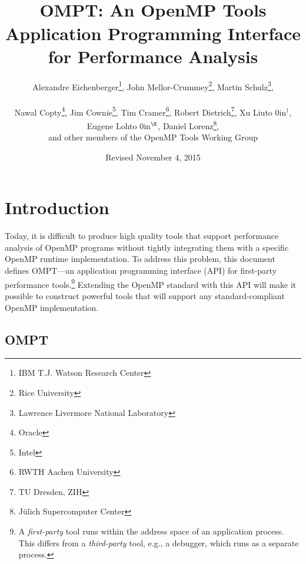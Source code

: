 \documentclass{article}
\title{OMPT: An OpenMP\textsuperscript{\textregistered} Tools Application Programming Interface for Performance Analysis}
\author{Alexandre Eichenberger\thanks{IBM T.J. Watson Research Center}, 
John Mellor-Crummey\thanks{Rice University}, 
Martin Schulz\thanks{Lawrence Livermore National Laboratory},
\\~\\
Nawal Copty\thanks{Oracle}, 
Jim Cownie\thanks{Intel},
Tim Cramer\thanks{RWTH Aachen University}, 
Robert Dietrich\thanks{TU Dresden, ZIH},
Xu Liu\hbox to 0in{$^\dagger$\hss},
Eugene Loh\hbox to 0in{$^\S$\hss}, 
Daniel Lorenz\thanks{J\"{u}lich Supercomputer Center}, 
\\
and other members of the OpenMP Tools Working Group}
\date{Revised November 4, 2015}
\begin{document}
  

                                           
\maketitle
\section{Introduction}
Today, it is difficult to produce high quality tools that support 
performance analysis of OpenMP programs without tightly integrating them with a specific OpenMP runtime implementation. To address this problem, this document defines OMPT---an application programming interface (API) for first-party performance tools.\footnote{A {\em first-party} tool runs within the address space of an application process. This differs from a {\em third-party} tool, e.g., a debugger, which runs as a separate process.}  
Extending the OpenMP standard with this API  will make it possible to construct powerful tools that will support any standard-compliant OpenMP implementation.

\subsection{OMPT}
\end{document}
